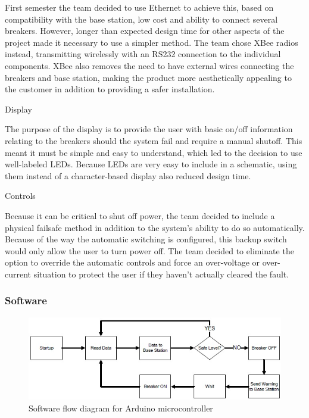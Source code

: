First semester the team decided to use Ethernet to achieve this, based on compatibility with the base station, low cost and ability to connect several breakers. However, longer than expected design time for other aspects of the project made it necessary to use a simpler method. The team chose XBee radios instead, transmitting wirelessly with an RS232 connection to the individual components. XBee also removes the need to have external wires connecting the breakers and base station, making the product more aesthetically appealing to the customer in addition to providing a safer installation. 

Display

The purpose of the display is to provide the user with basic on/off information relating to the breakers should the system fail and require a manual shutoff. This meant it must be simple and easy to understand, which led to the decision to use well-labeled LEDs. Because LEDs are very easy to include in a schematic, using them instead of a character-based display also reduced design time.  

Controls

Because it can be critical to shut off power, the team decided to include a physical failsafe method in addition to the system's ability to do so automatically. Because of the way the automatic switching is configured, this backup switch would only allow the user to turn power off. The team decided to eliminate the option to override the automatic controls and force an over-voltage or over-current situation to protect the user if they haven't actually cleared the fault.

\subsubsection{Software}

\begin{figure}[htbp]
\begin{center}
\includegraphics[width=6in]{includes/NJArduinoSoftware2}
\caption{Software flow diagram for Arduino microcontroller}
\label{fig:arduino_software_flow}
\end{center}
\end{figure}

